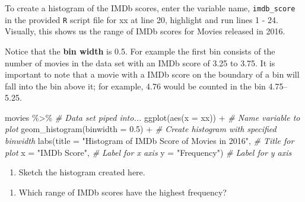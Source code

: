 \documentclass[
]{report}
\newenvironment{Shaded}{\begin{snugshade}}{\end{snugshade}}
\newcommand{\AttributeTok}[1]{\textcolor[rgb]{0.77,0.63,0.00}{#1}}
\newcommand{\CommentTok}[1]{\textcolor[rgb]{0.56,0.35,0.01}{\textit{#1}}}
\newcommand{\FloatTok}[1]{\textcolor[rgb]{0.00,0.00,0.81}{#1}}
\newcommand{\FunctionTok}[1]{\textcolor[rgb]{0.00,0.00,0.00}{#1}}
\newcommand{\NormalTok}[1]{#1}
\newcommand{\SpecialCharTok}[1]{\textcolor[rgb]{0.00,0.00,0.00}{#1}}
\newcommand{\StringTok}[1]{\textcolor[rgb]{0.31,0.60,0.02}{#1}}
\providecommand{\tightlist}{%
  \setlength{\itemsep}{0pt}\setlength{\parskip}{0pt}}
\begin{document}
\vspace{0.2in}

To create a histogram of the IMDb scores, enter the variable name, \texttt{imdb\_score} in the provided \texttt{R} script file for xx at line 20, highlight and run lines 1 - 24. Visually, this shows us the range of IMDb scores for Movies released in 2016.

Notice that the \textbf{bin width} is 0.5. For example the first bin consists of the number of movies in the data set with an IMDb score of 3.25 to 3.75. It is important to note that a movie with a IMDb score on the boundary of a bin will fall into the bin above it; for example, 4.76 would be counted in the bin 4.75--5.25.

\begin{Shaded}
\begin{Highlighting}[]
\NormalTok{movies }\SpecialCharTok{\%\textgreater{}\%} \CommentTok{\# Data set piped into...}
\FunctionTok{ggplot}\NormalTok{(}\FunctionTok{aes}\NormalTok{(}\AttributeTok{x =}\NormalTok{ xx)) }\SpecialCharTok{+}   \CommentTok{\# Name variable to plot}
  \FunctionTok{geom\_histogram}\NormalTok{(}\AttributeTok{binwidth =} \FloatTok{0.5}\NormalTok{) }\SpecialCharTok{+}  \CommentTok{\# Create histogram with specified binwidth}
  \FunctionTok{labs}\NormalTok{(}\AttributeTok{title =} \StringTok{"Histogram of IMDb Score of Movies in 2016"}\NormalTok{, }\CommentTok{\# Title for plot}
       \AttributeTok{x =} \StringTok{"IMDb Score"}\NormalTok{, }\CommentTok{\# Label for x axis}
       \AttributeTok{y =} \StringTok{"Frequency"}\NormalTok{) }\CommentTok{\# Label for y axis}
\end{Highlighting}
\end{Shaded}

\begin{enumerate}
\def\labelenumi{\arabic{enumi}.}
\setcounter{enumi}{8}
\tightlist
\item
  Sketch the histogram created here.
\end{enumerate}

\vspace{1.4in}

\begin{enumerate}
\def\labelenumi{\arabic{enumi}.}
\setcounter{enumi}{9}
\tightlist
\item
  Which range of IMDb scores have the highest frequency?
\end{enumerate}

\vspace{0.2in}
\end{document}
